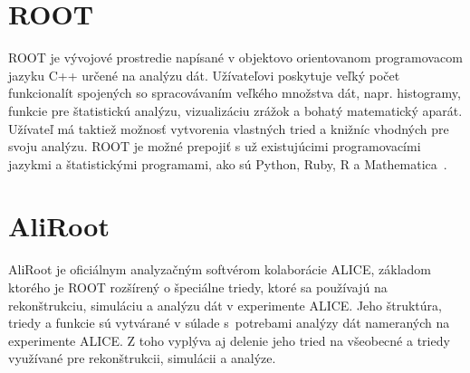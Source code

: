 \documentclass[thesismargins, thesislinespacing]{rnthesis}
\begin{document}


\section{ROOT}
ROOT je vývojové prostredie napísané v objektovo orientovanom programovacom jazyku C++ určené na analýzu dát. Užívateľovi poskytuje veľký počet funkcionalít spojených so spracovávaním veľkého množstva dát, napr. histogramy, funkcie pre štatistickú analýzu, vizualizáciu zrážok a bohatý matematický aparát. Užívateľ má taktiež možnosť vytvorenia vlastných tried a knižníc vhodných pre svoju analýzu. ROOT je možné prepojiť s už existujúcimi programovacími jazykmi a štatistickými programami, ako sú Python, Ruby, R a Mathematica~\cite{root}.

\section{AliRoot}
AliRoot \cite{aliroot} je oficiálnym analyzačným softvérom kolaborácie ALICE, základom ktorého je ROOT rozšírený o špeciálne triedy, ktoré sa používajú na rekonštrukciu, simuláciu a analýzu dát v experimente ALICE. Jeho štruktúra, triedy a funkcie sú vytvárané v súlade s~potrebami analýzy dát nameraných na experimente ALICE. Z toho vyplýva aj delenie jeho tried na všeobecné a triedy využívané pre rekonštrukcii, simulácii a analýze. 
\end{document}
